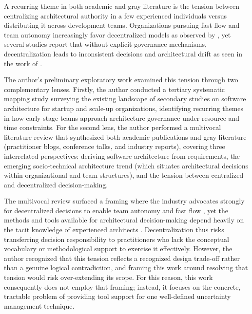 A recurring theme in both academic and gray literature is the tension between
centralizing architectural authority in a few experienced individuals versus distributing it
across development teams. Organizations pursuing fast flow and team autonomy
increasingly favor decentralized models as observed by \citet{salameh2021architecture, deDiana2011arch},
yet several studies report that without explicit governance mechanisms, decentralization
leads to inconsistent decisions and architectural drift as seen in the work of \citet{silveiraNeto2025agile, dasanayake2017collaborative, deDiana2011arch}.

The author's preliminary exploratory work examined this tension through two complementary
lenses. Firstly, the author conducted a tertiary systematic mapping study surveying the existing landscape of secondary studies on software architecture for
startup and scale-up organizations, identifying recurring themes in how early-stage
teams approach architecture governance under resource and time constraints. For the second lens, the author 
performed a multivocal literature review that synthesized both academic
publications and gray literature (practitioner blogs, conference talks, and industry
reports), covering three interrelated perspectives: deriving software architecture from
requirements, the emerging socio-technical architecture trend (which situates
architectural decisions within organizational and team structures), and the tension
between centralized and decentralized decision-making.

The multivocal review surfaced a framing where the industry advocates strongly for decentralized
decisions to enable team autonomy and fast flow \citep{skelton2019}, yet the methods and tools available
for architectural decision-making depend heavily on the tacit knowledge of experienced
architects \citep{souza2019}. Decentralization thus risks transferring decision responsibility to
practitioners who lack the conceptual vocabulary or methodological support to exercise
it effectively. However, the author recognized that this tension reflects a recognized design trade-off 
rather than a genuine logical contradiction, and framing this work around resolving that tension would risk over-extending its scope.
For this reason, this work consequently does not employ that framing; instead, it focuses on the
concrete, tractable problem of providing tool support for one well-defined uncertainty
management technique.

